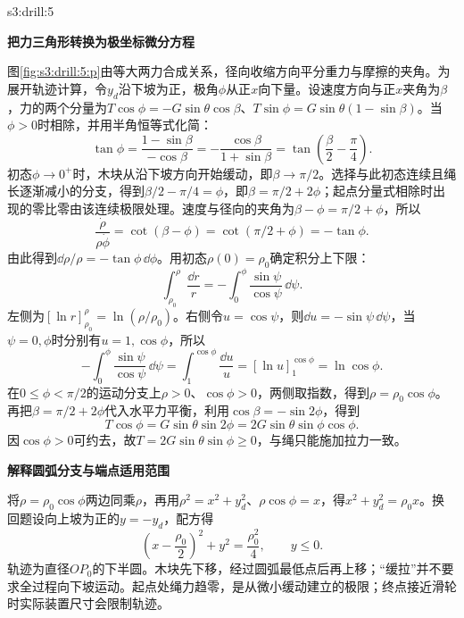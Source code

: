 \begin{drillsolution}{s3:drill:5}
\par\medskip{}\noindent\textbf{把力三角形转换为极坐标微分方程}\par\nobreak
图\ref{fig:s3:drill:5:p}由等大两力合成关系，径向收缩方向平分重力与摩擦的夹角。为展开轨迹计算，令$y_d$沿下坡为正，极角$\phi$从正$x$向下量。设速度方向与正$x$夹角为$\beta$，力的两个分量为$T\cos\phi=-G\sin\theta\cos\beta$、$T\sin\phi=G\sin\theta(1-\sin\beta)$。当$\phi>0$时相除，并用半角恒等式化简：
\[
\tan\phi
=\frac{1-\sin\beta}{-\cos\beta}
=-\frac{\cos\beta}{1+\sin\beta}
=\tan\left(\frac\beta2-\frac\pi4\right).
\]
初态$\phi\to0^+$时，木块从沿下坡方向开始缓动，即$\beta\to\pi/2$。选择与此初态连续且绳长逐渐减小的分支，得到$\beta/2-\pi/4=\phi$，即$\beta=\pi/2+2\phi$；起点分量式相除时出现的零比零由该连续极限处理。速度与径向的夹角为$\beta-\phi=\pi/2+\phi$，所以
\[
\frac{\dot\rho}{\rho\dot\phi}
=\cot(\beta-\phi)=\cot(\pi/2+\phi)=-\tan\phi.
\]
由此得到$\dd\rho/\rho=-\tan\phi\,\dd\phi$。用初态$\rho(0)=\rho_0$确定积分上下限：
\[
\int_{\rho_0}^{\rho}\frac{\dd r}{r}
=-\int_0^\phi\frac{\sin\psi}{\cos\psi}\,\dd\psi.
\]
左侧为$[\ln r]_{\rho_0}^{\rho}=\ln(\rho/\rho_0)$。右侧令$u=\cos\psi$，则$\dd u=-\sin\psi\,\dd\psi$，当$\psi=0,\phi$时分别有$u=1,\cos\phi$，所以
\[
-\int_0^\phi\frac{\sin\psi}{\cos\psi}\,\dd\psi
=\int_1^{\cos\phi}\frac{\dd u}{u}
=[\ln u]_1^{\cos\phi}=\ln\cos\phi.
\]
在$0\le\phi<\pi/2$的运动分支上$\rho>0$、$\cos\phi>0$，两侧取指数，得到$\rho=\rho_0\cos\phi$。再把$\beta=\pi/2+2\phi$代入水平力平衡，利用$\cos\beta=-\sin2\phi$，得到
\[
T\cos\phi=G\sin\theta\sin2\phi
=2G\sin\theta\sin\phi\cos\phi.
\]
因$\cos\phi>0$可约去，故$T=2G\sin\theta\sin\phi\ge0$，与绳只能施加拉力一致。



\par\medskip{}\noindent\textbf{解释圆弧分支与端点适用范围}\par\nobreak
将$\rho=\rho_0\cos\phi$两边同乘$\rho$，再用$\rho^2=x^2+y_d^2$、$\rho\cos\phi=x$，得$x^2+y_d^2=\rho_0x$。换回题设向上坡为正的$y=-y_d$，配方得
\[
\left(x-\frac{\rho_0}{2}\right)^2+y^2
=\frac{\rho_0^2}{4},\qquad y\le0.
\]
轨迹为直径$OP_0$的下半圆。木块先下移，经过圆弧最低点后再上移；“缓拉”并不要求全过程向下坡运动。起点处绳力趋零，是从微小缓动建立的极限；终点接近滑轮时实际装置尺寸会限制轨迹。\end{drillsolution}
